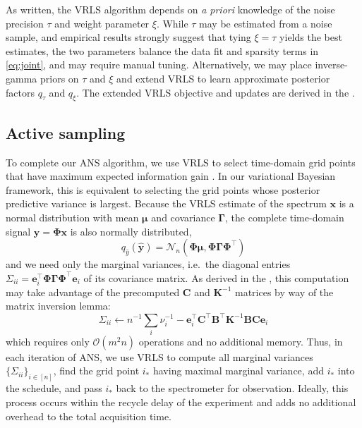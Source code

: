 \documentclass[final,5p,times,twocolumn]{elsarticle}
\newcommand{\m}[1]{\boldsymbol{#1}}
\begin{document}
As written, the VRLS algorithm depends on \emph{a priori} knowledge of the
noise precision $\tau$ and weight parameter $\xi$. While $\tau$ may be
estimated from a noise sample, and empirical results strongly suggest that
tying $\xi=\tau$ yields the best estimates, the two parameters balance the
data fit and sparsity terms in \eqref{eq:joint}, and may require manual
tuning. Alternatively, we may place inverse-gamma priors on $\tau$ and $\xi$
and extend VRLS to learn approximate posterior factors $q_\tau$ and $q_\xi$.
The extended VRLS objective and updates are derived in the .

\subsection{Active sampling}
\label{subsec:ans}
To complete our ANS algorithm, we use VRLS to select time-domain grid points
that have maximum expected information gain \cite{mackay:nc1992}. In our
variational Bayesian framework, this is equivalent to selecting the grid
points whose posterior predictive variance is largest. Because the VRLS
estimate of the spectrum $\m{x}$ is a normal distribution with mean
$\m{\mu}$ and covariance $\m{\Gamma}$, the complete time-domain signal
$\m{\hat y} = \m{\Phi} \m{x}$ is also normally distributed,
\begin{equation}
q_{\hat y}(\m{\hat y}) =
 \mathcal{N}_n(\m{\Phi} \m{\mu}, \m{\Phi} \m{\Gamma} \m{\Phi}^\top)
\end{equation}
and we need only the marginal variances, i.e.~the diagonal entries
$\Sigma_{ii} = \m{e}_i^\top \m{\Phi} \m{\Gamma} \m{\Phi}^\top \m{e}_i$
of its covariance matrix. As derived in the , this
computation may take advantage of the precomputed $\m{C}$ and
$\m{K}^{-1}$ matrices by way of the matrix inversion lemma:
\begin{equation}
\Sigma_{ii} \gets
 n^{-1} {\textstyle\sum_i} \nu_i^{-1} -
 \m{e}_i^\top \m{C}^\top \m{B}^\top \m{K}^{-1} \m{B} \m{C} \m{e}_i
\end{equation}
which requires only $\mathcal{O}(m^2 n)$ operations and no additional
memory. Thus, in each iteration of ANS, we use VRLS to compute all
marginal variances $\{\Sigma_{ii}\}_{i \in [n]}$, find the grid point
$i_*$ having maximal marginal variance, add $i_*$ into the schedule,
and pass $i_*$ back to the spectrometer for observation. Ideally, this
process occurs within the recycle delay of the experiment and adds no
additional overhead to the total acquisition time.
\end{document}
